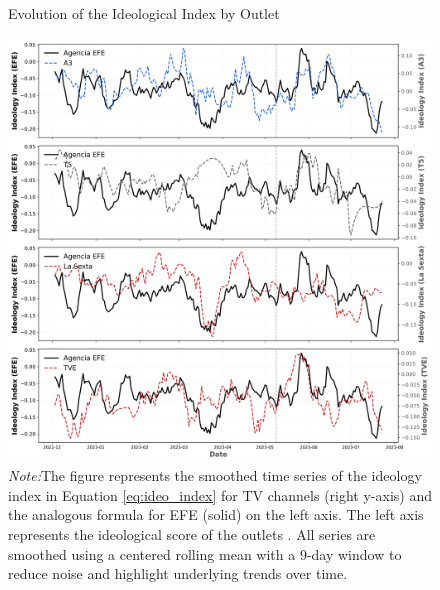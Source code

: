 \documentclass[12pt]{article}
\begin{document}
	
	\begin{figure}[!htb]
		\caption{Evolution of the Ideological Index by Outlet}
		\centering
		\includegraphics[width=150mm]{figures/tv_vs_efe_net_diff_by_channel}
		\caption*{\small \textit{Note:}The figure represents the smoothed time series of the ideology index in Equation \ref{eq:ideo_index} for TV channels (right y-axis) and the analogous formula for  EFE (solid) on the left axis. The left axis represents the ideological score of the outlets . All series are smoothed using a centered rolling mean with a 9-day window to reduce noise and highlight underlying trends over time.}
		\label{fig:net_tone_by_channel}
	\end{figure}
	
	
	
\end{document}
